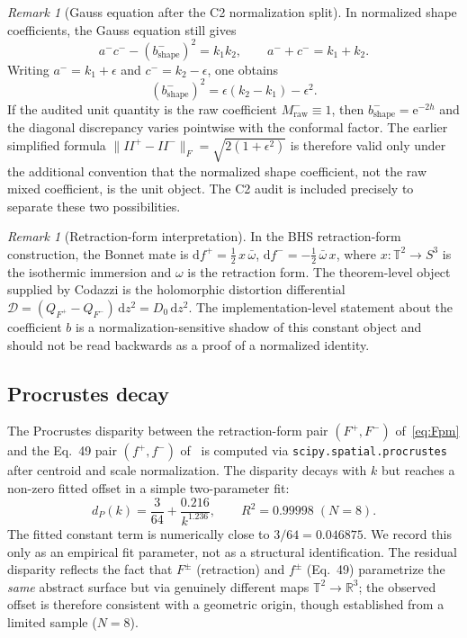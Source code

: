 \documentclass[11pt,a4paper]{article}
\theoremstyle{plain}
\theoremstyle{definition}
\theoremstyle{remark}
\newtheorem{remark}[theorem]{Remark}
\newcommand{\RR}{\mathbb{R}}
\newcommand{\T}{\mathbb{T}}             %
\newcommand{\dd}{\mathrm{d}}
\newcommand{\ee}{\mathrm{e}}
\newcommand{\norm}[1]{\lVert #1 \rVert}
\begin{document}
\begin{remark}[Gauss equation after the C2 normalization split]
\label{rem:DeltaII-structure}
In normalized shape coefficients, the Gauss equation still gives
\[
  a^-c^- - (b^-_{\mathrm{shape}})^2=k_1k_2,
  \qquad a^-+c^-=k_1+k_2.
\]
Writing $a^-=k_1+\epsilon$ and $c^-=k_2-\epsilon$, one obtains
\[
  (b^-_{\mathrm{shape}})^2
  = \epsilon(k_2-k_1)-\epsilon^2.
\]
If the audited unit quantity is the raw coefficient
$M^-_{\mathrm{raw}}\equiv1$, then
$b^-_{\mathrm{shape}}=\ee^{-2h}$ and the diagonal discrepancy varies
pointwise with the conformal factor.  The earlier simplified formula
$\norm{II^+-II^-}_F=\sqrt{2(1+\epsilon^2)}$ is therefore valid only
under the additional convention that the normalized shape coefficient,
not the raw mixed coefficient, is the unit object.  The C2 audit is
included precisely to separate these two possibilities.
\end{remark}

\begin{remark}[Retraction-form interpretation]\label{rem:retraction-b1}
  In the BHS retraction-form construction, the Bonnet mate is
  $\dd f^+ = \tfrac{1}{2}\,x\,\bar\omega$,
  $\dd f^- = -\tfrac{1}{2}\,\bar\omega\,x$,
  where $x : \T^2 \to S^3$ is the isothermic immersion and
  $\omega$ is the retraction form.  The theorem-level object supplied by
  Codazzi is the holomorphic distortion differential
  $\mathcal D=(Q_{F^+}-Q_{F^-})\,\dd z^2=D_0\,\dd z^2$.
  The implementation-level statement about the coefficient $b$ is a
  normalization-sensitive shadow of this constant object and should not
  be read backwards as a proof of a normalized identity.
\end{remark}

\subsection{Procrustes decay}\label{sec:procrustes}
The Procrustes disparity between the retraction-form pair
$(F^+, F^-)$ of~\eqref{eq:Fpm} and the Eq.~49 pair $(f^+, f^-)$
of~\cite{BHS-comp} is computed via
\texttt{scipy.spatial.procrustes} after centroid and scale
normalization.  The disparity decays with $k$ but reaches a
non-zero fitted offset in a simple two-parameter fit:
\begin{equation}
  d_P(k) = \frac{3}{64} + \frac{0.216}{k^{1.236}},
  \qquad R^2 = 0.99998 \;(N = 8).
  \label{eq:procrustes}
\end{equation}
The fitted constant term is numerically close to $3/64 = 0.046875$.
We record this only as an empirical fit parameter, not as a structural
identification.  The residual disparity reflects the fact that $F^\pm$
(retraction) and $f^\pm$ (Eq.~49) parametrize the \emph{same}
abstract surface but via genuinely different maps $\T^2 \to \RR^3$;
the observed offset is therefore consistent with a geometric origin,
though established from a limited sample ($N=8$).
\end{document}
